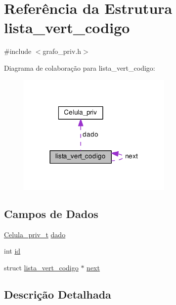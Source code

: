 \hypertarget{structlista__vert__codigo}{}\section{Referência da Estrutura lista\+\_\+vert\+\_\+codigo}
\label{structlista__vert__codigo}


{\ttfamily \#include $<$grafo\+\_\+priv.\+h$>$}



Diagrama de colaboração para lista\+\_\+vert\+\_\+codigo\+:
\nopagebreak
\begin{figure}[H]
\begin{center}
\leavevmode
\includegraphics[width=213pt]{structlista__vert__codigo__coll__graph}
\end{center}
\end{figure}
\subsection*{Campos de Dados}
\begin{DoxyCompactItemize}
\item 
\hyperlink{grafo_8h_ac2219b5d1f94e440b5895ce440ab23b9}{Celula\+\_\+priv\+\_\+t} \hyperlink{structlista__vert__codigo_a8e51b3141307b34cb74d6433a136f73b}{dado}
\item 
int \hyperlink{structlista__vert__codigo_acc7c3bce66ab242ba6e64e763dfb63b3}{id}
\item 
struct \hyperlink{structlista__vert__codigo}{lista\+\_\+vert\+\_\+codigo} $\ast$ \hyperlink{structlista__vert__codigo_af1cac7f22cb6142a13bd1f9c41f4c0b5}{next}
\end{DoxyCompactItemize}


\subsection{Descrição Detalhada}


